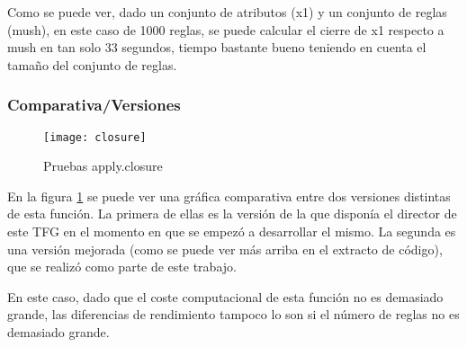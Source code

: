 Como se puede ver, dado un conjunto de atributos (x1) y un conjunto de reglas (mush), en este caso de 1000 reglas, se puede calcular el cierre de x1 respecto a mush en tan solo 33 segundos, tiempo bastante bueno teniendo en cuenta el tama\~no del conjunto de reglas.
\subsubsection{Comparativa/Versiones} 

\begin{figure}[h]
    \centering
    \texttt{[image: closure]}
    \caption{Pruebas apply.closure}
    \label{fig:closure}
\end{figure} 

En la figura \ref{fig:closure} se puede ver una gr\'afica comparativa entre dos versiones distintas de esta funci\'on. La primera de ellas es la versi\'on de la que dispon\'ia el director de este TFG en el momento en que se empez\'o a desarrollar el mismo. La segunda es una versi\'on mejorada (como se puede ver m\'as arriba en el extracto de c\'odigo), que se realiz\'o como parte de este trabajo.

En este caso, dado que el coste computacional de esta funci\'on no es demasiado grande, las diferencias de rendimiento tampoco lo son si el n\'umero de reglas no es demasiado grande.

